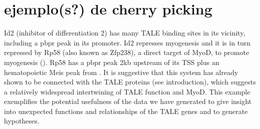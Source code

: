 \section{ejemplo(s?) de cherry picking}


Id2 (inhibitor of differentiation 2) has many \ac{TALE} binding sites in its vicinity, including a \ac{pbpr} peak in its promoter. Id2 represses myogenesis and it is in turn repressed by Rp58 (also known as Zfp238), a direct target of MyoD, to promote myogenesis (\cite{Yokoyama2009}). Rp58 has a \ac{pbpr} peak 2kb upstream of its TSS plus an hematopoietic Meis peak from \cite{Wilson2010}. It is suggestive that this system has already shown to be connected with the \ac{TALE} proteins (see introduction), which suggests a relatively widespread intertwining of \ac{TALE} function and MyoD. This example exemplifies the potential usefulness of the data we have generated to give insight into unexpected functions and relationships of the \ac{TALE} genes and to generate hypotheses. 

